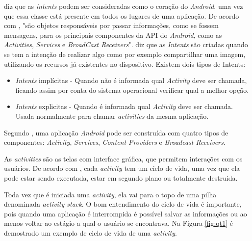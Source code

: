 	\par {} diz que as \textit{intents} podem ser
consideradas como o coração do \textit{Android}, uma vez que essa classe está
presente em todos os lugares de uma aplicação. De acordo com
, "são objetos responsáveis por passar informações,
como se fossem mensagens, para os principais componentes da API do
\textit{Android}, como as \textit{Activities}, \textit{Services} e
\textit{BroadCast Receivers}".  diz que as
\textit{Intents} são criadas quando se tem a intenção de realizar algo como por
exemplo compartilhar uma imagem, utilizando os recursos já existentes no
dispositivo. Existem dois tipos de Intents:
	
	\begin{itemize}
	  
	  \item \textit{Intents} implícitas - Quando não é informada qual
	  \textit{Activity} deve ser chamada, ficando assim por conta do sistema
	  operacional verificar qual a melhor opção.
	  
	  \item \textit{Intents} explicitas - Quando é informada qual
	  \textit{Activity} deve ser chamada. Usada normalmente para chamar
	  \textit{activities} da mesma aplicação.
	  
	\end{itemize}
	
	\par Segundo , uma aplicação \textit{Android} pode ser
construída com quatro tipos de componentes: \textit{Activity},
\textit{Services}, \textit{Content Providers} e \textit{Broadcast Receivers}.

	\par As \textit{activities} são as telas com interface gráfica, que permitem
interações com os usuários. De acordo com , cada
\textit{activity} tem um ciclo de vida, uma vez que ela pode estar sendo
executada, estar em segundo plano ou totalmente destruída.

	\par Toda vez que é iniciada uma \textit{activity}, ela vai para o topo de uma
pilha denominada \textit{activity stack}. O bom entendimento do ciclo de vida é
importante, pois quando uma aplicação é interrompida é possível salvar as
informações ou ao menos voltar ao estágio a qual o usuário se encontrava. Na
Figura \ref{fig:qt1} é demostrado um exemplo de ciclo de vida de uma
\textit{activity}.

